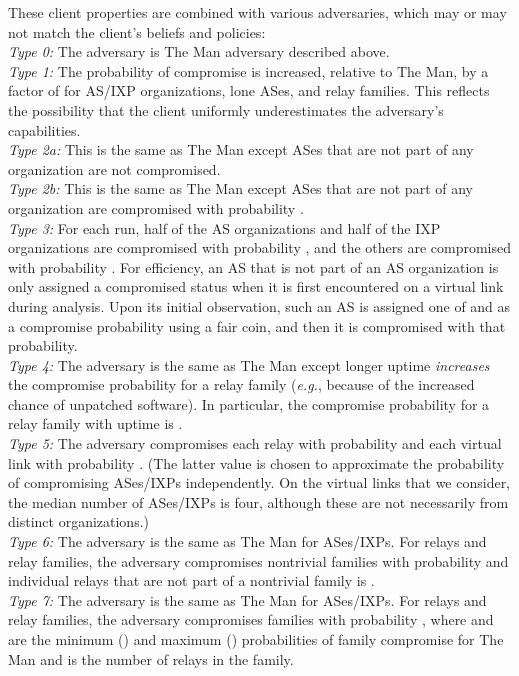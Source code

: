 \documentclass[conference]{styles/IEEEtran}
\newcommand{\eg}{\emph{e.g.}}
\begin{document}
These client properties are combined with various adversaries, which may or may not match the client's beliefs and policies:\\
    \textit{Type 0:} The adversary is \textsf{The Man} adversary described above.\\
	\textit{Type 1:} The probability of compromise is increased, relative to \textsf{The Man}, by a factor of  for AS/IXP organizations, lone ASes, and relay families.  This reflects the possibility that the client uniformly underestimates the adversary's capabilities.\\
	\textit{Type 2a:} This is the same as \textsf{The Man} except ASes that are not part of any organization are not compromised.\\
	\textit{Type 2b:} This is the same as \textsf{The Man} except ASes that are not part of any organization are compromised with probability .\\
	\textit{Type 3:} For each run, half of the AS organizations and half of the IXP organizations are compromised with probability , and the others are compromised with probability . For
efficiency, an AS that is not part of an AS organization is only assigned a compromised status
when it is first encountered on a virtual link during analysis. Upon its initial observation, such
an AS is assigned one of  and  as a compromise probability using a fair coin, and then
it is compromised with that probability.\\
	\textit{Type 4:} The adversary is the same as \textsf{The Man} except longer uptime \emph{increases} the compromise probability for a relay family (\eg, because of the increased chance of unpatched software).  In particular, the compromise probability for a relay family with uptime  is .\\
	\textit{Type 5:} The adversary compromises each relay with probability  and each virtual link with probability .  (The latter value is chosen to approximate the probability of compromising ASes/IXPs independently.  On the virtual links that we consider, the median number of ASes/IXPs is four, although these are not necessarily from distinct organizations.)\\
\textit{Type 6:} The adversary is the same as \textsf{The Man} for ASes/IXPs.  For relays and relay families, the adversary compromises nontrivial families with probability  and individual relays that are not part of a nontrivial family is .\\
	\textit{Type 7:} The adversary is the same as \textsf{The Man} for ASes/IXPs.  For relays and relay families, the adversary compromises families with probability , where  and  are the minimum () and maximum () probabilities of family compromise for \textsf{The Man} and  is the number of relays in the family.
\end{document}

